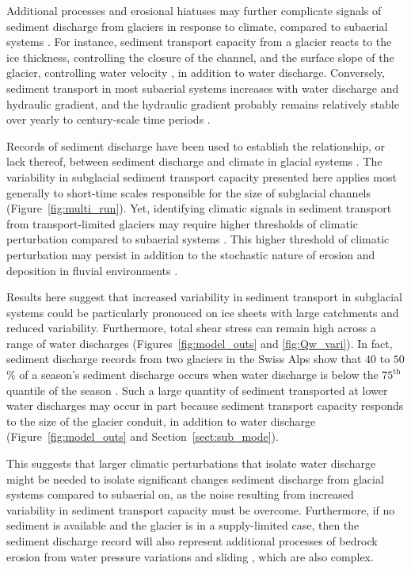 \documentclass[11pt]{article}
\begin{document}
Additional processes and erosional hiatuses may further complicate signals of sediment discharge from glaciers in response to climate, compared to subaerial systems \citep{jansson2005,ganti2016}. 
For instance, sediment transport capacity from a glacier reacts to the ice thickness, controlling the closure of the channel, and the surface slope of the glacier, controlling water velocity \citep[Section~\ref{sect:sub_mode}; ][]{rothlisberger1972,shreve1972,delaney2022,stevens2022}, in addition to water discharge.
Conversely, sediment transport in most subaerial systems increases with water discharge and hydraulic gradient, and the hydraulic gradient probably remains relatively stable over yearly to century-scale time periods \citep[Section~\ref{sect:fluv}; e.g.][]{muller1968,whipple1999,wong2006,wickert2019}. 

Records of sediment discharge have been used to establish the relationship, or lack thereof, between sediment discharge and climate in glacial systems \citep[e.g.][]{koppes2009a,willenbring2016,mariotti2021}.
The variability in subglacial sediment transport capacity presented here applies most generally to short-time scales responsible for the size of subglacial channels (Figure~\ref{fig:multi_run}).
Yet, identifying climatic signals in sediment transport from transport-limited glaciers may require higher thresholds of climatic perturbation compared to subaerial systems \citep{tofelde2021}.
This higher threshold of climatic perturbation may persist in addition to the stochastic nature of erosion and deposition in fluvial environments \citep{castletort2003,jerolmack2010,romans2016}.

Results here suggest that increased variability in sediment transport in subglacial systems  could be particularly pronouced on ice sheets with large catchments and reduced variability.
Furthermore, total shear stress can remain high across a range of water discharges (Figures~\ref{fig:model_outs} and \ref{fig:Qw_vari}).
In fact, sediment discharge records from two glaciers in the Swiss Alps show that $40$ to $50$\% of a season's sediment discharge occurs when water discharge is below the $75^{\mathrm{th}}$ quantile of the season \citep{delaney2018}.
Such a large quantity of sediment transported at lower water discharges may occur in part because sediment transport capacity responds to the size of the glacier conduit, in addition to water discharge (Figure~\ref{fig:model_outs} and Section~\ref{sect:sub_mode}).

This suggests that larger climatic perturbations that isolate  water discharge might be needed to isolate significant changes sediment discharge from glacial systems compared to subaerial on, as the noise resulting from increased variability in sediment transport capacity must be overcome.
Furthermore, if no sediment is available and the glacier is in a supply-limited case, then the sediment discharge record will also represent additional processes of bedrock erosion from  water pressure variations and sliding  \citep{iverson2012,herman2015}, which are also complex.
\end{document}
